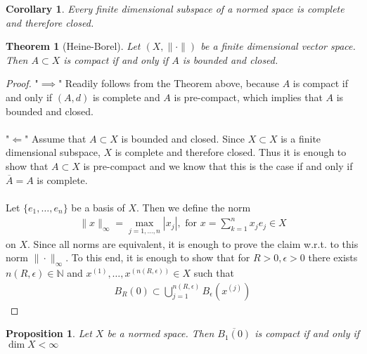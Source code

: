 \documentclass[11pt,a4paper]{article}
\newtheorem{thm}{Theorem}[section]
\newtheorem{prop}{Proposition}[section]
\newtheorem{cor}{Corollary}[section]
\theoremstyle{definition}
\begin{document}
\begin{cor} Every finite dimensional subspace of a normed space is complete and therefore closed. 
\end{cor}
\begin{thm}[Heine-Borel] Let $(X, \| \cdot\|)$ be a finite dimensional vector space. Then $A \subset X$ is compact if and only if $A$ is bounded and closed.  
\end{thm}
\begin{proof}
"$\implies$" Readily follows from the Theorem above, because $A$ is compact if and only if $(A,d)$ is complete and $A$ is pre-compact, which implies that $A$ is bounded and closed. 
\\\\
"$\Longleftarrow$" Assume that $A \subset X$ is bounded and closed. Since $X \subset X$ is a finite dimensional subspace, $X$ is complete and therefore closed. Thus it is enough to show that $A \subset X$ is pre-compact and we know that this is the case if and only if $\overline{A}=A$ is complete. 
\\\\
Let $\lbrace e_1, \dots , e_n \rbrace$ be a basis of $X$. Then we define the norm \begin{align*}
\|x\|_\infty = \max_{j=1, \dots , n} | x_j|, \text{ for } x = \sum_{k=1}^n x_j e_j \in X
\end{align*}
on $X$. Since all norms are equivalent, it is enough to prove the claim w.r.t. to this norm $\| \cdot \|_\infty$. To this end, it is enough to show that for $R>0, \epsilon >0$ there exists $n(R, \epsilon) \in \mathbb{N}$ and $x^{(1)}, \dots , x^{(n(R, \epsilon))} \in X$ such that \begin{align*}
B_R(0) \subset \bigcup_{j=1}^{n(R, \epsilon)} B_\epsilon (x^{(j)}) 
\end{align*}
\end{proof}
\begin{prop} Let $X$ be a normed space. Then $\overline{B_1(0)}$ is compact if and only if $\dim X < \infty$
\end{prop}
\end{document}
